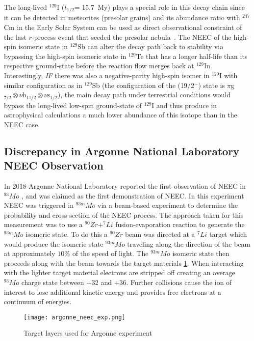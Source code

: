 \documentclass[jon_ringuette_thesis_proposal.tex]{subfiles}
\begin{document}
    The long-lived $^{129}$I ($t_{1/2}$= 15.7~My) plays a special role in this decay chain since it can be detected in meteorites (presolar grains) and its abundance ratio with $^{247}$Cm in the Early Solar System can be used as direct observational constraint of the last $r$-process event that seeded the presolar nebula~\cite{Ben21}.
    The NEEC of the high-spin isomeric state in $^{129}$Sb can alter the decay path back to stability via bypassing the high-spin isomeric state in $^{129}$Te that has a longer half-life than its respective ground-state before the reaction flow merges back at $^{129}$In.
    Interestingly, \textit{IF} there was also a negative-parity high-spin isomer in $^{129}$I with similar configuration as in $^{129}$Sb (the configuration of the (19/2$^-$) state is $\pi$g$_{7/2}\otimes\nu$h$_{11/2}\otimes\nu$s$_{1/2}$), the main decay path under terrestrial conditions would bypass the long-lived low-spin ground-state of $^{129}$I and thus produce in astrophysical calculations a much lower abundance of this isotope than in the NEEC case.

    \subsection{\label{discrepancy} Discrepancy in Argonne National Laboratory NEEC Observation}
    In 2018 Argonne National Laboratory reported the first observation of NEEC in  $^{93}Mo$ \cite{Chiara2018}, and was claimed as the first demonstration of NEEC.
    In this experiment NEEC was triggered in $^{93m}Mo$ via a beam-based experiment to determine the probability and cross-section of the NEEC process.
    The approach taken for this measurement was to use a $^{90}Zr + ^{7}Li$ fusion-evaporation reaction to generate the $^{93m}Mo$ isomeric state.
    To do this a $^{90}Zr$ beam was directed at a $^{7}Li$ target which would produce the isomeric state $^{93m}Mo$ traveling along the direction of the beam at approximately $10\%$ of the speed of light.
    The $^{93m}Mo$ isomeric state then proceeds along with the beam towards the target materials \ref{fig:argonne_neec_exp}.
    When interacting with the lighter target material electrons are stripped off creating an average $^{93}Mo$ charge state between +32 and +36.
    Further collisions cause the ion of interest to lose additional kinetic energy and provides free electrons at a continuum of energies.

    \begin{figure}[H]
        \begin{center}
            \texttt{[image: argonne\_neec\_exp.png]}
        \end{center}
        \caption{Target layers used for Argonne experiment \cite{Chiara2018}}
        \label{fig:argonne_neec_exp}
    \end{figure}
\end{document}
